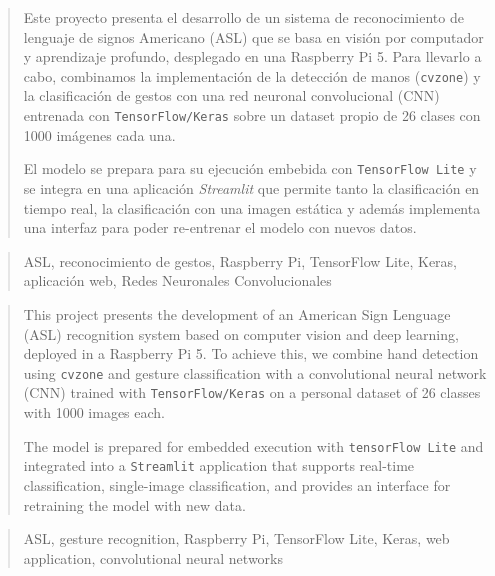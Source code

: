 \documentclass[a4paper,12pt,twoside]{memoir}
\begin{document}
\frontmatter

\renewcommand*\abstractname{Resumen}
\begin{abstract}
Este proyecto presenta el desarrollo de un sistema de reconocimiento de lenguaje de signos Americano (ASL) que se basa en visión por computador y aprendizaje profundo, desplegado en una Raspberry Pi 5. Para llevarlo a cabo, combinamos la implementación de la detección de manos (\texttt{cvzone}) y la clasificación de gestos con una red neuronal convolucional (CNN) entrenada con \texttt{TensorFlow/Keras} sobre un dataset propio de 26 clases con 1000 imágenes cada una. 

El modelo se prepara para su ejecución embebida con \texttt{TensorFlow Lite} y se integra en una aplicación \textit{Streamlit} que permite tanto la clasificación en tiempo real, la clasificación con una imagen estática y además implementa una interfaz para poder re-entrenar el modelo con nuevos datos.
\end{abstract}

\renewcommand*\abstractname{Descriptores}
\begin{abstract}
ASL, reconocimiento de gestos, Raspberry Pi, TensorFlow Lite, Keras, aplicación web, Redes Neuronales Convolucionales
\end{abstract}

\clearpage

\renewcommand*\abstractname{Abstract}
\begin{abstract}
This project presents the development of an American Sign Lenguage (ASL) recognition system based on computer vision and deep learning, deployed in a Raspberry Pi 5. To achieve this, we combine hand detection using \texttt{cvzone} and gesture classification with a convolutional neural network (CNN) trained with \texttt{TensorFlow/Keras} on a personal dataset of 26 classes with 1000 images each.

The model is prepared for embedded execution with \texttt{tensorFlow Lite} and integrated into a \texttt{Streamlit} application that supports real-time classification, single-image classification, and provides an interface for retraining the model with new data.
\end{abstract}

\renewcommand*\abstractname{Keywords}
\begin{abstract}
ASL, gesture recognition, Raspberry Pi, TensorFlow Lite, Keras, web application, convolutional neural networks
\end{abstract}
\end{document}
